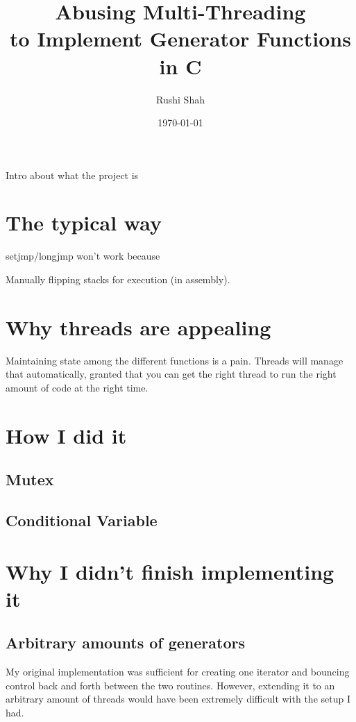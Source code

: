 \documentclass[12pt]{article}
\title{Abusing Multi-Threading \\ to Implement Generator Functions in C}
\author{Rushi Shah}
\date{\today}
\begin{document}
  \maketitle

  Intro about what the project is 

  \section{The typical way}

  setjmp/longjmp won't work because

  Manually flipping stacks for execution (in assembly). 

  \section{Why threads are appealing}

    Maintaining state among the different functions is a pain. Threads will manage that automatically, granted that you can get the right thread to run the right amount of code at the right time. 

  \section{How I did it}
    \subsection{Mutex}

    \subsection{Conditional Variable}

  \section{Why I didn't finish implementing it}
    \subsection{Arbitrary amounts of generators}
      My original implementation was sufficient for creating one iterator and bouncing control back and forth between the two routines. However, extending it to an arbitrary amount of threads would have been extremely difficult with the setup I had.  

    \subsection{}
\end{document}
